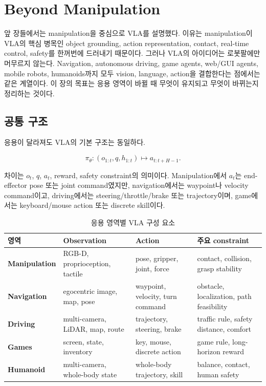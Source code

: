 \chapter{Beyond Manipulation}
\label{ch:beyond_manipulation}

앞 장들에서는 manipulation을 중심으로 VLA를 설명했다. 이유는 manipulation이 VLA의 핵심 병목인 object grounding, action representation, contact, real-time control, safety를 한꺼번에 드러내기 때문이다. 그러나 VLA의 아이디어는 로봇팔에만 머무르지 않는다. Navigation, autonomous driving, game agents, web/GUI agents, mobile robots, humanoids까지 모두 vision, language, action을 결합한다는 점에서는 같은 계열이다. 이 장의 목표는 응용 영역이 바뀔 때 무엇이 유지되고 무엇이 바뀌는지 정리하는 것이다.

\section{공통 구조}

응용이 달라져도 VLA의 기본 구조는 동일하다.

\begin{equation}
  \pi_\theta:
  (o_{1:t}, q, h_{1:t})
  \mapsto
  a_{t:t+H-1}.
\end{equation}

차이는 $o_t$, $q$, $a_t$, reward, safety constraint의 의미이다. Manipulation에서 $a_t$는 end-effector pose 또는 joint command였지만, navigation에서는 waypoint나 velocity command이고, driving에서는 steering/throttle/brake 또는 trajectory이며, game에서는 keyboard/mouse action 또는 discrete skill이다.

\begin{table}[t]
  \centering
  \caption{응용 영역별 VLA 구성 요소}
  \label{tab:beyond_manipulation_domains}
  \begin{tabularx}{\textwidth}{>{\bfseries}p{25mm}p{30mm}p{34mm}X}
    \toprule
    영역 & Observation & Action & 주요 constraint \\
    \midrule
    Manipulation & RGB-D, proprioception, tactile & pose, gripper, joint, force & contact, collision, grasp stability \\
    Navigation & egocentric image, map, pose & waypoint, velocity, turn command & obstacle, localization, path feasibility \\
    Driving & multi-camera, LiDAR, map, route & trajectory, steering, brake & traffic rule, safety distance, comfort \\
    Games & screen, state, inventory & key, mouse, discrete action & game rule, long-horizon reward \\
    Humanoid & multi-camera, whole-body state & whole-body trajectory, skill & balance, contact, human safety \\
    \bottomrule
  \end{tabularx}
\end{table}


